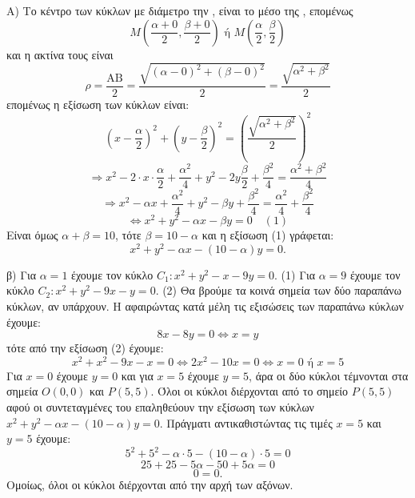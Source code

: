 Α) Το κέντρο των κύκλων με διάμετρο την , είναι το μέσο της , επομένως
\[ M \left( \frac{\alpha+0}{2}, \frac{\beta+0}{2} \right) \text{ ή } M \left( \frac{\alpha}{2}, \frac{\beta}{2} \right) \]
και η ακτίνα τους είναι
\[ \rho = \frac{\text{AB}}{2} = \frac{\sqrt{(\alpha-0)^2+(\beta-0)^2}}{2} = \frac{\sqrt{\alpha^2+\beta^2}}{2} \]
επομένως η εξίσωση των κύκλων είναι:
\[ \left(x-\frac{\alpha}{2}\right)^2 + \left(y-\frac{\beta}{2}\right)^2 = \left(\frac{\sqrt{\alpha^2+\beta^2}}{2}\right)^2 \]
\[ \Rightarrow x^2 - 2 \cdot x \cdot \frac{\alpha}{2} + \frac{\alpha^2}{4} + y^2 - 2y \frac{\beta}{2} + \frac{\beta^2}{4} = \frac{\alpha^2+\beta^2}{4} \]
\[ \Rightarrow x^2 - \alpha x + \frac{\alpha^2}{4} + y^2 - \beta y + \frac{\beta^2}{4} = \frac{\alpha^2}{4} + \frac{\beta^2}{4} \]
\[ \Leftrightarrow x^2 + y^2 - \alpha x - \beta y = 0 \quad (1) \]
Είναι όμως $\alpha+\beta=10$, τότε $\beta=10-\alpha$ και η εξίσωση (1) γράφεται:
\[ x^2+y^2-\alpha x - (10-\alpha)y=0. \]

β) Για $\alpha=1$ έχουμε τον κύκλο $C_1: x^2+y^2-x-9y=0$. (1)
Για $\alpha=9$ έχουμε τον κύκλο $C_2: x^2+y^2-9x-y=0$. (2)
Θα βρούμε τα κοινά σημεία των δύο παραπάνω κύκλων, αν υπάρχουν.
Η αφαιρώντας κατά μέλη τις εξισώσεις των παραπάνω κύκλων έχουμε:
\[ 8x - 8y = 0 \Leftrightarrow x=y \]
τότε από την εξίσωση (2) έχουμε:
\[ x^2+x^2-9x-x=0 \Leftrightarrow 2x^2-10x=0 \Leftrightarrow x=0 \text{ ή } x=5 \]
Για $x=0$ έχουμε $y=0$ και για $x=5$ έχουμε $y=5$, άρα οι δύο κύκλοι τέμνονται στα σημεία $O(0,0)$ και $P(5,5)$.
Όλοι οι κύκλοι διέρχονται από το σημείο $P(5,5)$ αφού οι συντεταγμένες του επαληθεύουν την εξίσωση των κύκλων $x^2+y^2-\alpha x - (10-\alpha)y=0$.
Πράγματι αντικαθιστώντας τις τιμές $x=5$ και $y=5$ έχουμε:
\[ 5^2+5^2-\alpha \cdot 5 - (10-\alpha) \cdot 5 = 0 \]
\[ 25+25-5\alpha - 50+5\alpha = 0 \]
\[ 0=0. \]
Ομοίως, όλοι οι κύκλοι διέρχονται από την αρχή των αξόνων.

